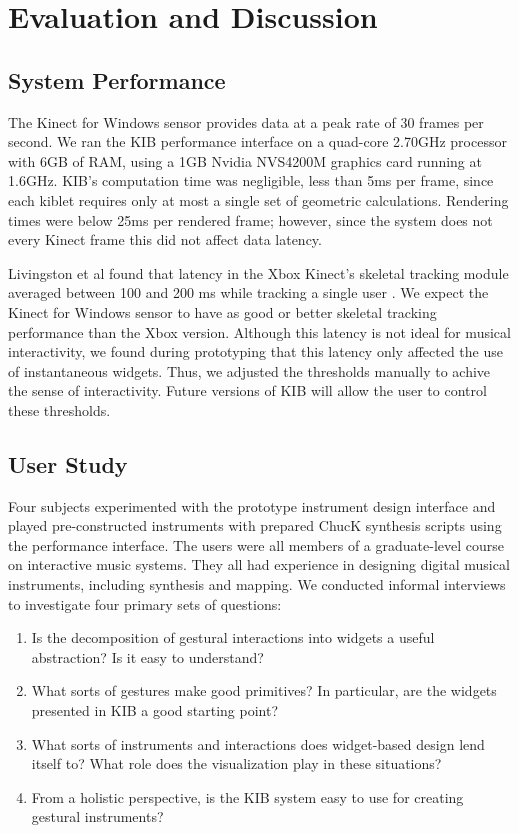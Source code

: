 \documentclass{nime-alternate}
\begin{document}
\section{Evaluation and Discussion}
\subsection{System Performance}
The Kinect for Windows sensor provides data at a peak rate of 30 frames per second. We ran
the KIB performance interface on a quad-core 2.70GHz processor with 6GB of RAM, using a
1GB Nvidia NVS4200M graphics card running at 1.6GHz. KIB's
computation time was negligible, less than 5ms per frame, since each kiblet requires only at
most a single set of geometric calculations. Rendering times were below 25ms per rendered
frame; however, since the system does not every Kinect frame this did not affect
data latency.

Livingston et al found that latency in the Xbox Kinect's skeletal tracking module
averaged between 100 and 200 ms while
tracking a single user \cite{livingston2012performance}. We expect the Kinect for Windows
sensor to have as good or better skeletal tracking performance than the Xbox version. Although
this latency is not ideal for musical interactivity, we found during prototyping that this
latency only affected the use of instantaneous widgets. Thus, we adjusted the thresholds
manually to achive the sense of interactivity. Future versions of KIB will allow the user to
control these thresholds.
\subsection{User Study}
Four subjects experimented with the prototype instrument design interface
and played pre-constructed instruments with prepared ChucK synthesis scripts using the performance interface.
The users were all members of a graduate-level course on interactive music systems. They all had
experience in designing digital musical instruments, including synthesis and mapping. 
We conducted informal interviews to investigate four primary sets of questions:
\begin{enumerate}
\item Is the decomposition of gestural interactions into widgets a useful abstraction? Is it easy to understand?
\item What sorts of gestures make good primitives? In particular, are the widgets presented in KIB a good starting point?
\item What sorts of instruments and interactions does widget-based design lend itself to? What role does the visualization
play in these situations?
\item From a holistic perspective, is the KIB system easy to use for creating gestural instruments?
\end{enumerate}
\end{document}
